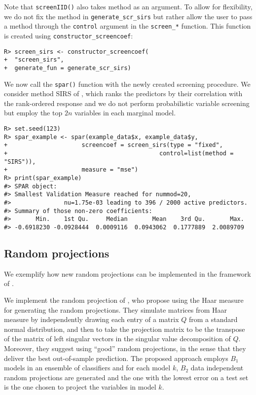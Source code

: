 \documentclass[
  article]{jss}
\begin{document}
Note that \texttt{screenIID()} also takes method as an argument. To
allow for flexibility, we do not fix the method in
\texttt{generate\_scr\_sirs} but rather allow the user to pass a method
through the \texttt{control} argument in the \texttt{screen\_*}
function. This function is created using
\texttt{constructor\_screencoef}:

\begin{verbatim}
R> screen_sirs <- constructor_screencoef(
+  "screen_sirs", 
+  generate_fun = generate_scr_sirs)
\end{verbatim}

We now call the \texttt{spar()} function with the newly created
screening procedure. We consider method SIRS of \citet{zhu2011model},
which ranks the predictors by their correlation with the rank-ordered
response and we do not perform probabilistic variable screening but
employ the top \(2n\) variables in each marginal model.

\begin{verbatim}
R> set.seed(123)      
R> spar_example <- spar(example_data$x, example_data$y,
+                     screencoef = screen_sirs(type = "fixed",
+                                           control=list(method = "SIRS")),
+                     measure = "mse")
R> print(spar_example)
#> SPAR object:
#> Smallest Validation Measure reached for nummod=20,
#>               nu=1.75e-03 leading to 396 / 2000 active predictors.
#> Summary of those non-zero coefficients:
#>       Min.    1st Qu.     Median       Mean    3rd Qu.       Max. 
#> -0.6918230 -0.0928444  0.0009116  0.0943062  0.1777889  2.0089709
\end{verbatim}

\subsection{Random projections}\label{random-projections-1}

We exemplify how new random projections can be implemented in the
framework of .

We implement the random projection of \citet{cannings2017random}, who
propose using the Haar measure for generating the random projections.
They simulate matrices from Haar measure by independently drawing each
entry of a matrix \(Q\) from a standard normal distribution, and then to
take the projection matrix to be the transpose of the matrix of left
singular vectors in the singular value decomposition of \(Q\). Moreover,
they suggest using ``good'' random projections, in the sense that they
deliver the best out-of-sample prediction. The proposed approach employs
\(B_1\) models in an ensemble of classifiers and for each model \(k\),
\(B_2\) data independent random projections are generated and the one
with the lowest error on a test set is the one chosen to project the
variables in model \(k\).
\end{document}
